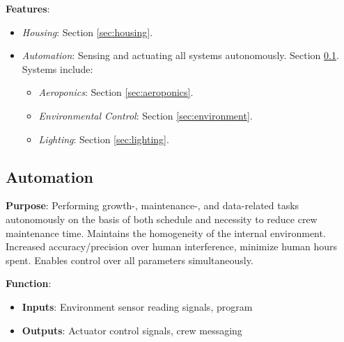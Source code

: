 \documentclass{../tex/report}
\begin{document}
\textbf{Features}:
\begin{itemize}
    \item \textit{Housing}: Section \ref{sec:housing}.
    \item \textit{Automation}: Sensing and actuating all systems autonomously. Section \ref{sec:automation}. Systems include:
    \begin{itemize}
        \item \textit{Aeroponics}: Section \ref{sec:aeroponics}.
        \item \textit{Environmental Control}: Section \ref{sec:environment}.
        \item \textit{Lighting}: Section \ref{sec:lighting}.
    \end{itemize}
\end{itemize}

\newpage

\subsection{Automation}
\label{sec:automation}

\textbf{Purpose}: Performing growth-, maintenance-, and data-related tasks autonomously on the basis of both schedule and necessity to reduce crew maintenance time. Maintains the homogeneity of the internal environment. Increased accuracy/precision over human interference, minimize human hours spent. Enables control over all parameters simultaneously.

\textbf{Function}:
\begin{itemize}
    \item \textbf{Inputs}: Environment sensor reading signals, program
    \item \textbf{Outputs}: Actuator control signals, crew messaging
\end{itemize}
\end{document}
